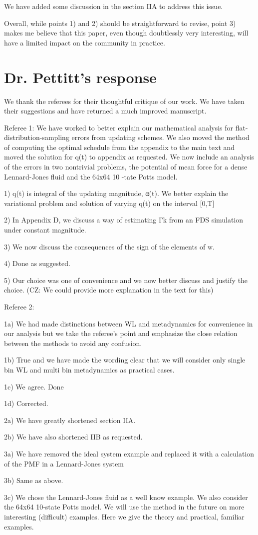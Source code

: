 \documentclass[preprint, superscriptaddress, floatfix]{revtex4-1}
\begin{document}
We have added some discussion in the section IIA to address this issue.


Overall, while points 1) and 2) should be straightforward to revise, point 3) makes me believe that this paper, even though doubtlessly very interesting, will have a limited impact on the community in practice.

\section{Dr. Pettitt's response}

We thank the referees for their thoughtful critique of our work. We have taken their suggestions and have returned a much improved manuscript.

Referee 1: We have worked to better explain our mathematical analysis for flat-distribution-sampling errors from updating schemes. We also moved the method of computing the optimal schedule from the appendix to the main text and moved the solution for q(t) to appendix as requested. We now include an analysis of the errors in two nontrivial problems, the potential of mean force for a dense Lennard-Jones fluid and the 64x64 10 -tate Potts model.

1) q(t) is integral of the updating magnitude, α(t). We better explain the variational problem and solution of varying q(t) on the interval [0,T]

2) In Appendix D, we discuss a way of estimating Γk from an FDS simulation under constant magnitude.

3) We now discuss the consequences of the sign of the elements of w.

4) Done as suggested.

5) Our choice was one of convenience and we now better discuss and justify the choice. (CZ: We could provide more explanation in the text for this)

Referee 2:

1a) We had made distinctions between WL and metadynamics for convenience in our analysis but we take the referee’s point and emphasize the close relation between the methods to avoid any confusion.

1b) True and we have made the wording clear that we will consider only single bin WL and multi bin metadynamics as practical cases.

1c) We agree. Done

1d) Corrected.

2a) We have greatly shortened section IIA.

2b) We have also shortened IIB as requested.

3a) We have removed the ideal system example and replaced it with a calculation of the PMF in a Lennard-Jones system

3b) Same as above.

3c) We chose the Lennard-Jones fluid as a well know example. We also consider the 64x64 10-state Potts model. We will use the method in the future on more interesting (difficult) examples. Here we give the theory and practical, familiar examples.
\end{document}
